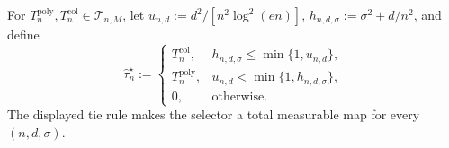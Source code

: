 For \(T_n^{\mathrm{poly}},T_n^{\mathrm{col}}\in\mathcal T_{n,M}\), let \(u_{n,d}:=d^2/[n^2\log^2(en)]\), \(h_{n,d,\sigma}:=\sigma^2+d/n^2\), and define \[\widehat\tau_n^{\star}:=\begin{cases}T_n^{\mathrm{col}},&h_{n,d,\sigma}\le\min\{1,u_{n,d}\},\\T_n^{\mathrm{poly}},&u_{n,d}<\min\{1,h_{n,d,\sigma}\},\\0,&\text{otherwise}.\end{cases}\] The displayed tie rule makes the selector a total measurable map for every \((n,d,\sigma)\).